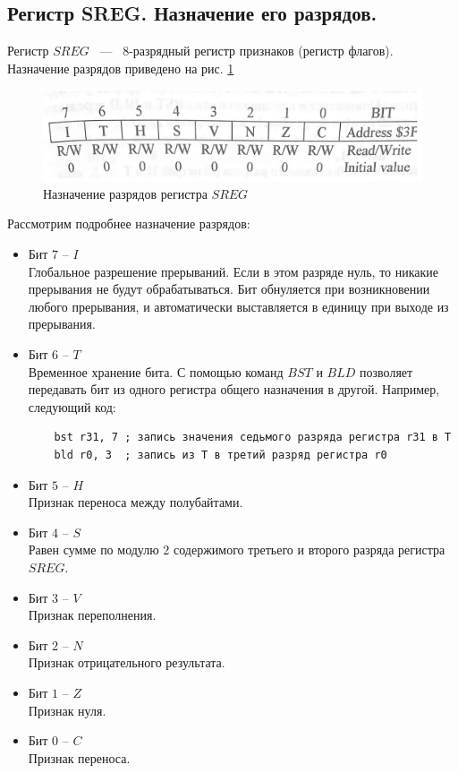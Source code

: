 \subsection{Регистр SREG. Назначение его  разрядов.}
Регистр $SREG$ ~---~ $8$-разрядный регистр признаков (регистр флагов).
Назначение разрядов приведено на рис. \ref{img::2_3_2}
\begin{figure}[h]
  \includegraphics[width=\linewidth]{./src/pics/2.3.2.png}
  \caption{Назначение разрядов регистра $SREG$}
  \label{img::2_3_2}
\end{figure}
Рассмотрим подробнее назначение разрядов:
\begin{itemize}
  \item Бит $7$ -- $I$\\
  Глобальное разрешение прерываний.
  Если в этом разряде нуль, то никакие прерывания не будут обрабатываться.
  Бит обнуляется при возникновении любого прерывания, 
  и автоматически выставляется в единицу при выходе из прерывания.
  \item Бит $6$ -- $T$\\
  Временное хранение бита.
  С помощью команд $BST$ и $BLD$ позволяет передавать
  бит из одного регистра общего назначения в другой. Например,
  следующий код:
  \begin{verbatim}
    bst r31, 7 ; запись значения седьмого разряда регистра r31 в T
    bld r0, 3  ; запись из T в третий разряд регистра r0
  \end{verbatim}
  \item Бит $5$ -- $H$\\
  Признак переноса между полубайтами.
  \item Бит $4$ -- $S$\\
  Равен сумме по модулю $2$ содержимого третьего и второго разряда
  регистра $SREG$.
  \item Бит $3$ -- $V$\\
  Признак переполнения.
  \item Бит $2$ -- $N$\\
  Признак отрицательного результата.
  \item Бит $1$ -- $Z$\\
  Признак нуля.
  \item Бит $0$ -- $C$\\
  Признак переноса.
\end{itemize}

